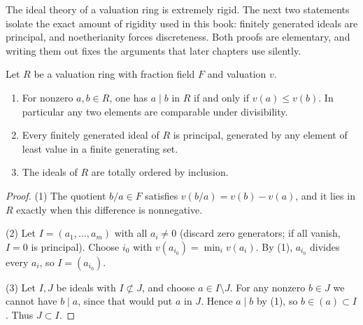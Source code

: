 The ideal theory of a valuation ring is extremely rigid.  The next two
statements isolate the exact amount of rigidity used in this book: finitely
generated ideals are principal, and noetherianity forces discreteness.  Both
proofs are elementary, and writing them out fixes the arguments that later
chapters use silently.

\begin{lemma}
\label{lem:valuation-ideals-principal}
Let $R$ be a valuation ring with fraction field $F$ and valuation $v$.
\begin{enumerate}
\item For nonzero $a,b\in R$, one has $a\mid b$ in $R$ if and only if
  $v(a)\leq v(b)$.  In particular any two elements are comparable under
  divisibility.
\item Every finitely generated ideal of $R$ is principal, generated by any
  element of least value in a finite generating set.
\item The ideals of $R$ are totally ordered by inclusion.
\end{enumerate}
\end{lemma}
\begin{proof}
(1) The quotient $b/a\in F$ satisfies $v(b/a)=v(b)-v(a)$, and it lies in $R$
exactly when this difference is nonnegative.

(2) Let $I=(a_1,\ldots,a_m)$ with all $a_i\ne0$ (discard zero generators;
if all vanish, $I=0$ is principal).  Choose $i_0$ with
$v(a_{i_0})=\min_iv(a_i)$.  By (1), $a_{i_0}$ divides every $a_i$, so
$I=(a_{i_0})$.

(3) Let $I,J$ be ideals with $I\not\subset J$, and choose
$a\in I\setminus J$.  For any nonzero $b\in J$ we cannot have
$b\mid a$, since that would put $a$ in $J$.  Hence $a\mid b$ by (1), so
$b\in(a)\subset I$.  Thus $J\subset I$.
\end{proof}

